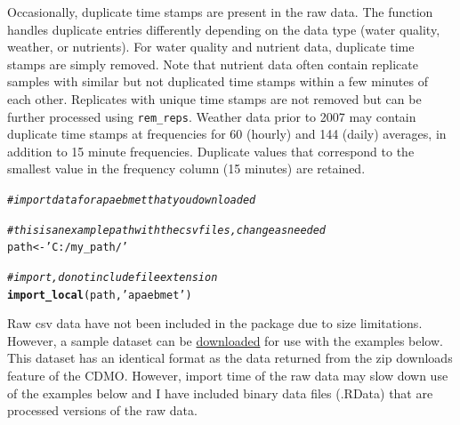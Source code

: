 \documentclass[10pt,letterpaper]{article}\usepackage[]{graphicx}\usepackage[]{color}
\makeatletter
\newcommand{\hlstr}[1]{\textcolor[rgb]{0.192,0.494,0.8}{#1}}%
\newcommand{\hlcom}[1]{\textcolor[rgb]{0.678,0.584,0.686}{\textit{#1}}}%
\newcommand{\hlstd}[1]{\textcolor[rgb]{0.345,0.345,0.345}{#1}}%
\newcommand{\hlkwb}[1]{\textcolor[rgb]{0.69,0.353,0.396}{#1}}%
\newcommand{\hlkwd}[1]{\textcolor[rgb]{0.737,0.353,0.396}{\textbf{#1}}}%
\newenvironment{kframe}{%
 \def\at@end@of@kframe{}%
 \ifinner\ifhmode%
  \def\at@end@of@kframe{\end{minipage}}%
  \begin{minipage}{\columnwidth}%
 \fi\fi%
 \def\FrameCommand##1{\hskip\@totalleftmargin \hskip-\fboxsep
 \colorbox{shadecolor}{##1}\hskip-\fboxsep
     \hskip-\linewidth \hskip-\@totalleftmargin \hskip\columnwidth}%
 \MakeFramed {\advance\hsize-\width
   \@totalleftmargin\z@ \linewidth\hsize
   \@setminipage}}%
 {\par\unskip\endMakeFramed%
 \at@end@of@kframe}
\newenvironment{knitrout}{}{} %
\makeatother
\begin{document}
Occasionally, duplicate time stamps are present in the raw data.  The function handles duplicate entries differently depending on the data type (water quality,  weather, or nutrients).  For water quality and nutrient data, duplicate time stamps are simply removed.  Note that nutrient data often contain replicate samples with similar but not duplicated time stamps within a few minutes of each other.  Replicates with unique time stamps are not removed but can be further processed using \texttt{rem\_reps}.  Weather data prior to 2007 may contain duplicate time stamps at frequencies for 60 (hourly) and 144 (daily) averages, in addition to 15 minute frequencies.  Duplicate values that correspond to the smallest value in the frequency column (15 minutes) are retained.  

\begin{knitrout}
\color{fgcolor}\begin{kframe}
\begin{alltt}
\hlcom{# import data for apaebmet that you downloaded}

\hlcom{# this is an example path with the csv files, change as needed}
\hlstd{path} \hlkwb{<-} \hlstr{'C:/my_path/'}

\hlcom{# import, do not include file extension}
\hlkwd{import_local}\hlstd{(path,} \hlstr{'apaebmet'}\hlstd{)}
\end{alltt}
\end{kframe}
\end{knitrout}

Raw csv data have not been included in the package due to size limitations.  However, a sample dataset can be \href{https://s3.amazonaws.com/swmpexdata/zip_ex.zip}{downloaded} for use with the examples below.  This dataset has an identical format as the data returned from the zip downloads feature of the CDMO.  However, import time of the raw data may slow down use of the examples below and I have included binary data files (.RData) that are processed versions of the raw data.    
\end{document}
